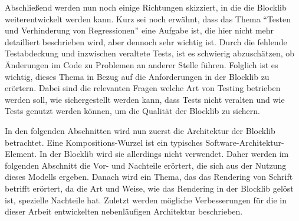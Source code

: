 Abschließend werden nun noch einige Richtungen skizziert, in die die Blocklib weiterentwickelt werden kann. Kurz sei noch erwähnt, dass das Thema \enquote{Testen und Verhinderung von Regressionen} eine Aufgabe ist, die hier nicht mehr detailliert beschrieben wird, aber dennoch sehr wichtig ist. Durch die fehlende Testabdeckung und inzwischen veraltete Tests, ist es schwierig abzuschätzen, ob Änderungen im Code zu Problemen an anderer Stelle führen. Folglich ist es wichtig, dieses Thema in Bezug auf die Anforderungen in der Blocklib zu erörtern. Dabei sind die relevanten Fragen welche Art von Testing betrieben werden soll, wie sichergestellt werden kann, dass Tests nicht veralten und wie Tests genutzt werden können, um die Qualität der Blocklib zu sichern.

In den folgenden Abschnitten wird nun zuerst die Architektur der Blocklib betrachtet. Eine Kompositions-Wurzel ist ein typisches Software-Architektur-Element. In der Blocklib wird sie allerdings nicht verwendet. Daher werden im folgenden Abschnitt die Vor- und Nachteile erörtert, die sich aus der Nutzung dieses Modells ergeben. Danach wird ein Thema, das das Rendering von Schrift betrifft erörtert, da die Art und Weise, wie das Rendering in der Blocklib gelöst ist, spezielle Nachteile hat. Zuletzt werden mögliche Verbesserungen für die in dieser Arbeit entwickelten nebenläufigen Architektur beschrieben.